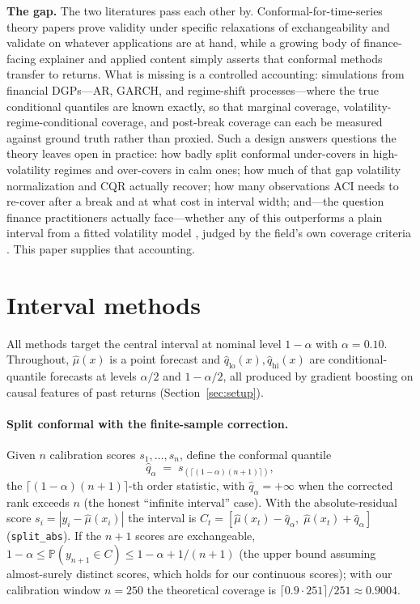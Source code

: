 \documentclass[11pt]{article}
\newcommand{\qhat}{\hat{q}}
\begin{document}
\textbf{The gap.} The two literatures pass each other by.
Conformal-for-time-series theory papers
\citep{chernozhukov2018exact,xu2021conformal,barber2023conformal,gibbs2021adaptive,gibbs2024conformal,zaffran2022adaptive}
prove validity under specific relaxations of exchangeability and validate on
whatever applications are at hand, while a growing body of finance-facing
explainer and applied content simply asserts that conformal methods transfer
to returns. What is missing is a controlled accounting: simulations from
financial DGPs---AR, GARCH, and regime-shift processes---where the true
conditional quantiles are known exactly, so that marginal coverage,
volatility-regime-conditional coverage, and post-break coverage can each be
measured against ground truth rather than proxied. Such a design answers
questions the theory leaves open in practice: how badly split conformal
under-covers in high-volatility regimes and over-covers in calm ones; how much
of that gap volatility normalization and CQR actually recover; how many
observations ACI needs to re-cover after a break and at what cost in interval
width; and---the question finance practitioners actually face---whether any of
this outperforms a plain interval from a fitted volatility model
\citep{bollerslev1986generalized}, judged by the field's own coverage criteria
\citep{christoffersen1998evaluating,kupiec1995techniques}. This paper supplies
that accounting.

\section{Interval methods}
\label{sec:methods}

All methods target the central interval at nominal level $1-\alpha$ with
$\alpha=0.10$. Throughout, $\hat\mu(x)$ is a point forecast and
$\hat{q}_{\mathrm{lo}}(x),\hat{q}_{\mathrm{hi}}(x)$ are conditional-quantile
forecasts at levels $\alpha/2$ and $1-\alpha/2$, all produced by gradient
boosting on causal features of past returns (Section~\ref{sec:setup}).

\paragraph{Split conformal with the finite-sample correction.} Given $n$
calibration scores $s_1,\dots,s_n$, define the conformal quantile
\begin{equation}
\qhat_\alpha \;=\; s_{(\lceil (1-\alpha)(n+1)\rceil)},
\label{eq:cq}
\end{equation}
the $\lceil (1-\alpha)(n+1)\rceil$-th order statistic, with
$\qhat_\alpha=+\infty$ when the corrected rank exceeds $n$ (the honest
``infinite interval'' case). With the absolute-residual score
$s_i=|y_i-\hat\mu(x_i)|$ the interval is
$C_t=[\hat\mu(x_t)-\qhat_\alpha,\;\hat\mu(x_t)+\qhat_\alpha]$
(\texttt{split\_abs}). If the $n+1$ scores are exchangeable,
$1-\alpha \le \mathbb{P}(y_{n+1}\in C) \le 1-\alpha + 1/(n+1)$
\citep{lei2018distribution} (the upper bound assuming almost-surely distinct
scores, which holds for our continuous scores); with our calibration window $n=250$ the
theoretical coverage is $\lceil 0.9\cdot 251\rceil/251 \approx 0.9004$.
\end{document}
